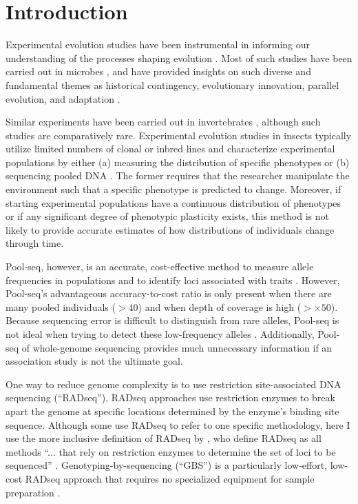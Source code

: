 

\section{Introduction}


Experimental evolution studies have been instrumental in informing our understanding
of the processes shaping evolution \citep{Elena:2003fr}. 
Most of such studies have been carried out in microbes
\citep[reviewed in][]{Dettman:2012gt,Jerison:2015kw}, and have provided insights on
such diverse and fundamental themes as historical contingency, evolutionary innovation,
parallel evolution, and adaptation
\citep{Blount:2008fo,Barrick:2009in,TollRiera:2016fd,Voordeckers:2015cl,Gerstein:2012ki}.


Similar experiments have been carried out in invertebrates
\citep{Gompert:2016eg,Chandler:2014bn,Burke:2010eq,Kang:2016ea,Rouchet:2014jl}, 
although such studies are comparatively rare.
Experimental evolution studies in insects typically utilize limited numbers of 
clonal or inbred lines \citep[e.g.,][]{Rouchet:2014jl,Kang:2016ea} and 
characterize experimental populations by either 
(a) measuring the distribution of specific phenotypes \citep[e.g.,][]{Rouchet:2014jl}
or
(b) sequencing pooled DNA \citep[``Pool-seq''; e.g.,][]{Burke:2010eq}.
The former requires that the researcher manipulate the environment such that a 
specific phenotype is predicted to change.
Moreover, if starting experimental populations have a continuous distribution of
phenotypes or if any significant degree of phenotypic plasticity exists, this method
is not likely to provide accurate estimates of how distributions of individuals change
through time.

Pool-seq, however, is an accurate, cost-effective method to measure allele frequencies
in populations \citep{Gautier:2013dv,Futschik:2010be}
and to identify loci associated with traits \citep{Rubin:2010es,Bastide:2013jx}.
However, Pool-seq's advantageous accuracy-to-cost ratio is only present when there
are many pooled individuals ($>40$) and when depth of coverage is high ($> \times 50$).
Because sequencing error is difficult to distinguish from rare alleles, 
Pool-seq is not ideal when trying to detect these low-frequency alleles
\citep{Schlotterer:2014dk}.
Additionally, Pool-seq of whole-genome sequencing provides much unnecessary 
information if an association study is not the ultimate goal.

One way to reduce genome complexity is to use restriction site-associated DNA 
sequencing (``RADseq'').
RADseq approaches use restriction enzymes to break apart the genome at specific 
locations determined by the enzyme's binding site sequence.
Although some use RADseq to refer to one specific methodology, here I use the more
inclusive definition of RADseq by
\citet{Andrews:2016bc}, who define RADseq as all methods 
``... that rely on restriction enzymes to determine the set of loci to be sequenced''
\citep[p 81]{Andrews:2016bc}.
Genotyping-by-sequencing (``GBS'') is a particularly low-effort, low-cost RADseq approach
that requires no specialized equipment for sample preparation \citep{Elshire:2011gn}.

